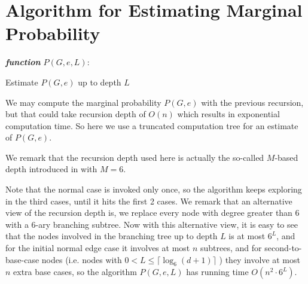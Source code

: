 
\section{Algorithm for Estimating Marginal Probability}

\IncMargin{1em}
\begin{algorithm}[H]
\emph{ \textbf{function} $P(G, e, L):$}
\BlankLine
{}
 \caption{Estimate $P(G,e)$ up to depth $L$}
\end{algorithm}
\DecMargin{1em}

We may compute the marginal probability $P(G, e)$ with the previous recursion, but
that could take recursion depth of $O(n)$ which results in exponential computation time.
So here we use a truncated computation tree for an estimate of $P(G,e)$.

We remark that the recursion depth used here is actually the so-called $M$-based depth introduced in \cite{LLY12} with $M=6$. 


Note that the normal case is invoked only once, so the algorithm keeps exploring in the third cases, until it hits the first 2 cases. We remark that an alternative view of the recursion depth is, we replace every node with degree greater than 6 with a $6$-ary branching subtree.
Now with this alternative view, it is easy to see that the nodes involved in the branching tree up to depth $L$ is at most $6^L$,
and for the initial normal edge case it involves at most $n$ subtrees, and for second-to-base-case nodes (i.e. nodes with $0<L \leq \lceil \log_6{(d+1)} \rceil $ ) they involve at most $n$ extra base cases, 
so the algorithm $P(G,e,L)$ has running time $O(n^2 \cdot 6^L)$.
%

